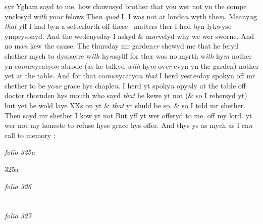\documentclass[12pt, a4paper]{book}
\begin{document}
               syr Ygham
			 sayd to me. how chaw\textit{n}syd brother that you wer not yn the compe ynclosyd w\textit{ith} yo\textit{ur} felows The\textit{n quod} I. I was not at londo\textit{n }wyth the\textit{m. }Meany\textit{n}g \textit{that }yff I had byn a setterforth off these   matters ther I had byn lykwyse ymprysonyd. And the wedenysday I askyd \& m\textit{ar}velyd  why we wer sworne. And no ma\textit{n} kew the cause. The thursday mr garden\textit{er }shewyd me that he feryd shether mych to dyspayre w\textit{ith} hy\textit{m}sylff for ther was no myrth w\textit{ith} hy\textit{m} nother yn co\textit{mun}ycatyo\textit{n} abrode (as he talkyd \textit{with} hy\textit{m} ov\textit{er} evyn yn the garden) nother yet at the table. And for that co\textit{mun}ycatyo\textit{n that} I herd yest\textit{er}day spokyn off mr shether to be yo\textit{ur} grace hys chaple\textit{n}. I herd yt spoky\textit{n} opy\textit{n}ly at the table off doctor thornden hys mouth who sayd \textit{that} he kewe yt not (\& so I rehersyd yt) but yet he wold laye XXs on yt \& \textit{that} yt shuld be so. \& so I told mr shether. Then sayd mr shether I kow yt not But yff yt wer offeryd to me. off my lord. yt wer not my honeste to refuse hyse grace hys offer.  And thys ys as mych as I ca\textit{n} call to memory ; 

\dotfill
					

\textit{folio 325a}


{\color{Mahogany}325a}

\dotfill
					

\textit{folio 326}


         \vspace{4cm}
         
\dotfill
					  \section*{}  \subsection*{}

\textit{folio 327}
\end{document}
